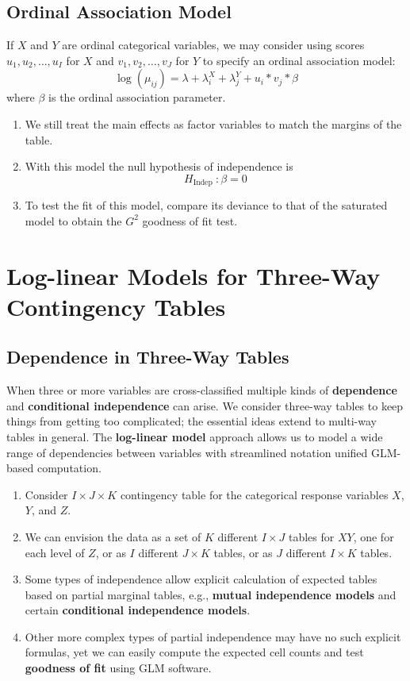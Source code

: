 \documentclass[11pt]{elegantbook}
\begin{document}
\subsection{Ordinal Association Model}
If $X$ and $Y$ are ordinal categorical variables, we may consider using scores $u_1, u_2, \ldots, u_I$ for $X$ and $v_1, v_2, \ldots, v_J$ for $Y$ to specify an ordinal association model:
$$
\log \left(\mu_{i j}\right)=\lambda+\lambda_i^X+\lambda_j^Y+u_i * v_j * \beta
$$
where $\beta$ is the ordinal association parameter.
\begin{enumerate}[$\bullet$]
    \item We still treat the main effects as factor variables to match the margins of the table.
    \item With this model the null hypothesis of independence is
    $$
    H_{\text {Indep }}: \beta=0
    $$
    \item To test the fit of this model, compare its deviance to that of the saturated model to obtain the $G^2$ goodness of fit test.
\end{enumerate}

\section{Log-linear Models for Three-Way Contingency Tables}
\subsection{Dependence in Three-Way Tables}
When three or more variables are cross-classified multiple kinds of \textbf{dependence} and \textbf{conditional independence} can arise. We consider three-way tables to keep things from getting too complicated; the essential ideas extend to multi-way tables in general. The \textbf{log-linear model} approach allows us to model a wide range of dependencies between variables with streamlined notation unified GLM-based computation.
\begin{enumerate}[$\bullet$]
    \item Consider $I \times J \times K$ contingency table for the categorical response variables $X$, $Y$, and $Z$.
    \item We can envision the data as a set of $K$ different $I \times J$ tables for $XY$, one for each level of $Z$, or as $I$ different $J\times K$ tables, or as $J$ different $I \times K$ tables.
    \item Some types of independence allow explicit calculation of expected tables based on partial marginal tables, e.g., \textbf{mutual independence models} and certain \textbf{conditional independence models}.
    \item Other more complex types of partial independence may have no such explicit formulas, yet we can easily compute the expected cell counts and test \textbf{goodness of fit} using GLM software.
\end{enumerate}
\end{document}
